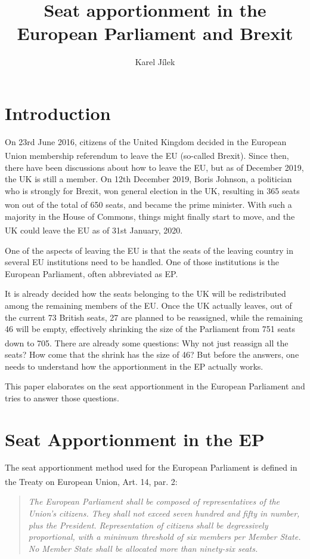 \documentclass[a4paper]{article}
\title{Seat apportionment in the European Parliament and Brexit}
\author{Karel Jílek}
\affil{ETH Zürich}
\theoremstyle{definition}
\begin{document}
\maketitle
\clearpage

\section{Introduction}
On 23rd June 2016, citizens of the United Kingdom decided in the European Union membership referendum to leave the EU (so-called Brexit).\textsuperscript{\cite{brexit}} Since then, there have been discussions about how to leave the EU, but as of December 2019, the UK is still a member. On 12th December 2019, Boris Johnson, a politician who is strongly for Brexit, won general election in the UK, resulting in 365 seats won out of the total of 650 seats\textsuperscript{\cite{election}}, and became the prime minister. With such a majority in the House of Commons, things might finally start to move, and the UK could leave the EU as of 31st January, 2020.\textsuperscript{\cite{brexit}}

One of the aspects of leaving the EU is that the seats of the leaving country in several EU institutions need to be handled. One of those institutions is the European Parliament, often abbreviated as EP.

It is already decided how the seats belonging to the UK will be redistributed among the remaining members of the EU. Once the UK actually leaves, out of the current 73 British seats, 27 are planned to be reassigned, while the remaining 46 will be empty, effectively shrinking the size of the Parliament from 751 seats down to 705.\textsuperscript{\cite{shrink}} There are already some questions: Why not just reassign all the seats? How come that the shrink has the size of 46? But before the answers, one needs to understand how the  apportionment in the EP actually works.

This paper elaborates on the seat apportionment in the European Parliament and tries to answer those questions.

\section{Seat Apportionment in the EP}

The seat apportionment method used for the European Parliament is defined in the Treaty on European Union, Art. 14, par. 2:\textsuperscript{\cite{eutreaty}}

\begin{quote}
	\textit{The European Parliament shall be composed of representatives of the Union's citizens. They shall not exceed seven hundred and fifty in number, plus the President. Representation of citizens shall be degressively proportional, with a minimum threshold of six members per Member State. No Member State shall be allocated more than ninety-six seats.}
\end{quote}
\end{document}
